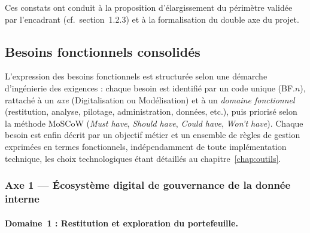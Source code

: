 \documentclass[../main.tex]{subfiles}
\begin{document}
Ces constats ont conduit à la proposition d'élargissement du périmètre validée par l'encadrant (cf.~section~1.2.3) et à la formalisation du double axe du projet.

\subsection{Besoins fonctionnels consolidés}

L'expression des besoins fonctionnels est structurée selon une démarche d'ingénierie des exigences : chaque besoin est identifié par un code unique (BF.$n$), rattaché à un \textit{axe} (Digitalisation ou Modélisation) et à un \textit{domaine fonctionnel} (restitution, analyse, pilotage, administration, données, etc.), puis priorisé selon la méthode MoSCoW (\textit{Must have}, \textit{Should have}, \textit{Could have}, \textit{Won't have}). Chaque besoin est enfin décrit par un objectif métier et un ensemble de règles de gestion exprimées en termes fonctionnels, indépendamment de toute implémentation technique, les choix technologiques étant détaillés au chapitre~\ref{chap:outils}.

\subsubsection{Axe 1 --- Écosystème digital de gouvernance de la donnée interne}

\paragraph{Domaine~1 : Restitution et exploration du portefeuille.}
\end{document}
